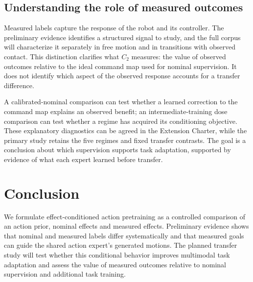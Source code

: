 \documentclass[conference]{IEEEtran}
\begin{document}
\balance
\subsection{Understanding the role of measured outcomes}
Measured labels capture the response of the robot and its controller. The preliminary evidence identifies a structured signal to study, and the full corpus will characterize it separately in free motion and in transitions with observed contact. This distinction clarifies what $C_2$ measures: the value of observed outcomes relative to the ideal command map used for nominal supervision. It does not identify which aspect of the observed response accounts for a transfer difference.

A calibrated-nominal comparison can test whether a learned correction to the command map explains an observed benefit; an intermediate-training dose comparison can test whether a regime has acquired its conditioning objective. These explanatory diagnostics can be agreed in the Extension Charter, while the primary study retains the five regimes and fixed transfer contrasts. The goal is a conclusion about which supervision supports task adaptation, supported by evidence of what each expert learned before transfer.

\section{Conclusion}
We formulate effect-conditioned action pretraining as a controlled comparison of an action prior, nominal effects and measured effects. Preliminary evidence shows that nominal and measured labels differ systematically and that measured goals can guide the shared action expert's generated motions. The planned transfer study will test whether this conditional behavior improves multimodal task adaptation and assess the value of measured outcomes relative to nominal supervision and additional task training.

\clearpage

\begingroup
{}

\endgroup
\end{document}
